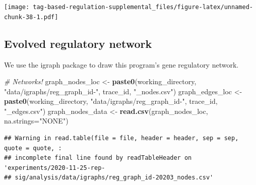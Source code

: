 \documentclass[
]{book}
\newenvironment{Shaded}{\begin{snugshade}}{\end{snugshade}}
\newcommand{\CommentTok}[1]{\textcolor[rgb]{0.56,0.35,0.01}{\textit{#1}}}
\newcommand{\DataTypeTok}[1]{\textcolor[rgb]{0.13,0.29,0.53}{#1}}
\newcommand{\KeywordTok}[1]{\textcolor[rgb]{0.13,0.29,0.53}{\textbf{#1}}}
\newcommand{\NormalTok}[1]{#1}
\newcommand{\StringTok}[1]{\textcolor[rgb]{0.31,0.60,0.02}{#1}}
\begin{document}
\texttt{[image: tag-based-regulation-supplemental\_files/figure-latex/unnamed-chunk-38-1.pdf]}

\hypertarget{evolved-regulatory-network}{%
\subsection{Evolved regulatory network}\label{evolved-regulatory-network}}

We use the igraph package to draw this program's gene regulatory network.

\begin{Shaded}
\begin{Highlighting}[]
\CommentTok{\# Networks!}
\NormalTok{graph\_nodes\_loc \textless{}{-}}\StringTok{ }\KeywordTok{paste0}\NormalTok{(working\_directory, }\StringTok{"data/igraphs/reg\_graph\_id{-}"}\NormalTok{, trace\_id, }\StringTok{"\_nodes.csv"}\NormalTok{)}
\NormalTok{graph\_edges\_loc \textless{}{-}}\StringTok{ }\KeywordTok{paste0}\NormalTok{(working\_directory, }\StringTok{"data/igraphs/reg\_graph\_id{-}"}\NormalTok{, trace\_id, }\StringTok{"\_edges.csv"}\NormalTok{)}
\NormalTok{graph\_nodes\_data \textless{}{-}}\StringTok{ }\KeywordTok{read.csv}\NormalTok{(graph\_nodes\_loc, }\DataTypeTok{na.strings=}\StringTok{"NONE"}\NormalTok{)}
\end{Highlighting}
\end{Shaded}

\begin{verbatim}
## Warning in read.table(file = file, header = header, sep = sep, quote = quote, :
## incomplete final line found by readTableHeader on 'experiments/2020-11-25-rep-
## sig/analysis/data/igraphs/reg_graph_id-20203_nodes.csv'
\end{verbatim}
\end{document}
